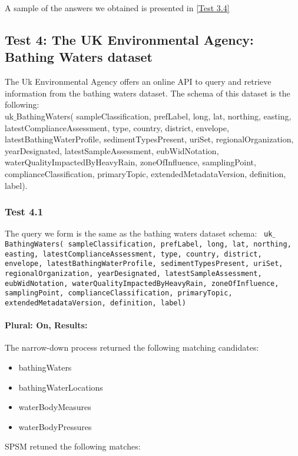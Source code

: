 \documentclass[a4paper,10pt]{article}
\begin{document}
A sample of the answers we obtained is presented in \ref{Test 3.4} 





\subsection{Test 4: The UK Environmental Agency: Bathing Waters dataset}
The Uk Environmental Agency offers an online API to query and retrieve information from the bathing waters dataset. The schema of this dataset is the following: \\
\indent uk$\_$BathingWaters( sampleClassification, prefLabel, long, lat, northing, easting,  latestComplianceAssessment, type, country, district,  envelope, latestBathingWaterProfile, sedimentTypesPresent, uriSet, regionalOrganization, yearDesignated, latestSampleAssessment, eubWidNotation, waterQualityImpactedByHeavyRain, zoneOfInfluence, samplingPoint, complianceClassification, primaryTopic, extendedMetadataVersion, definition, label).

\subsubsection{Test 4.1} 

The query we form is the same as the bathing waters dataset schema:
\indent \texttt{ uk$\_$BathingWaters( sampleClassification, prefLabel, long, lat, northing, easting,  latestComplianceAssessment, type, country, district,  envelope, latestBathingWaterProfile, sedimentTypesPresent, uriSet, regionalOrganization, yearDesignated, latestSampleAssessment, eubWidNotation, waterQualityImpactedByHeavyRain, zoneOfInfluence, samplingPoint, complianceClassification, primaryTopic, extendedMetadataVersion, definition, label)}

\paragraph{Plural: On, Results: } The narrow-down process returned the following matching candidates: 

\begin{itemize}
\item  bathingWaters
\item bathingWaterLocations
\item waterBodyMeasures
\item waterBodyPressures
\end{itemize}
SPSM retuned the following matches: 
\end{document}
